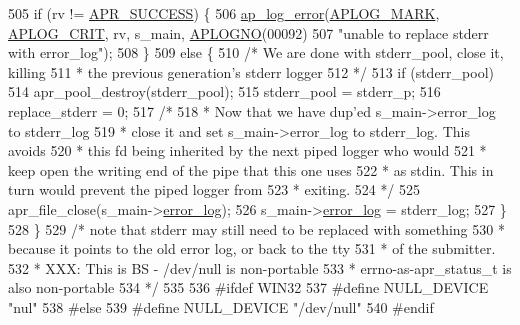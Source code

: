 \begin{DoxyCode}
505         \textcolor{keywordflow}{if} (rv != \hyperlink{group__apr__errno_ga9ee311b7bf1c691dc521d721339ee2a6}{APR\_SUCCESS}) \{
506             \hyperlink{group__APACHE__CORE__LOG_ga5e6676c87418af7a1d323a116c78ecb4}{ap\_log\_error}(\hyperlink{group__APACHE__CORE__LOG_ga655e126996849bcb82e4e5a14c616f4a}{APLOG\_MARK}, \hyperlink{group__APACHE__CORE__LOG_ga9f0686ea770c44e205d1c12be74fc21f}{APLOG\_CRIT}, rv, s\_main, 
      \hyperlink{group__APACHE__CORE__LOG_ga1dee8a07e06bc5b3de8b89662c2cd666}{APLOGNO}(00092)
507                          \textcolor{stringliteral}{"unable to replace stderr with error\_log"});
508         \}
509         \textcolor{keywordflow}{else} \{
510             \textcolor{comment}{/* We are done with stderr\_pool, close it, killing}
511 \textcolor{comment}{             * the previous generation's stderr logger}
512 \textcolor{comment}{             */}
513             \textcolor{keywordflow}{if} (stderr\_pool)
514                 apr\_pool\_destroy(stderr\_pool);
515             stderr\_pool = stderr\_p;
516             replace\_stderr = 0;
517             \textcolor{comment}{/*}
518 \textcolor{comment}{             * Now that we have dup'ed s\_main->error\_log to stderr\_log}
519 \textcolor{comment}{             * close it and set s\_main->error\_log to stderr\_log. This avoids}
520 \textcolor{comment}{             * this fd being inherited by the next piped logger who would}
521 \textcolor{comment}{             * keep open the writing end of the pipe that this one uses}
522 \textcolor{comment}{             * as stdin. This in turn would prevent the piped logger from}
523 \textcolor{comment}{             * exiting.}
524 \textcolor{comment}{             */}
525             apr\_file\_close(s\_main->\hyperlink{structserver__rec_a6b75cc308c1ea6dc45050badeaca804b}{error\_log});
526             s\_main->\hyperlink{structserver__rec_a6b75cc308c1ea6dc45050badeaca804b}{error\_log} = stderr\_log;
527         \}
528     \}
529     \textcolor{comment}{/* note that stderr may still need to be replaced with something}
530 \textcolor{comment}{     * because it points to the old error log, or back to the tty}
531 \textcolor{comment}{     * of the submitter.}
532 \textcolor{comment}{     * XXX: This is BS - /dev/null is non-portable}
533 \textcolor{comment}{     *      errno-as-apr\_status\_t is also non-portable}
534 \textcolor{comment}{     */}
535 
536 \textcolor{preprocessor}{#ifdef WIN32}
537 \textcolor{preprocessor}{#define NULL\_DEVICE "nul"}
538 \textcolor{preprocessor}{#else}
539 \textcolor{preprocessor}{#define NULL\_DEVICE "/dev/null"}
540 \textcolor{preprocessor}{#endif}

\end{DoxyCode}
